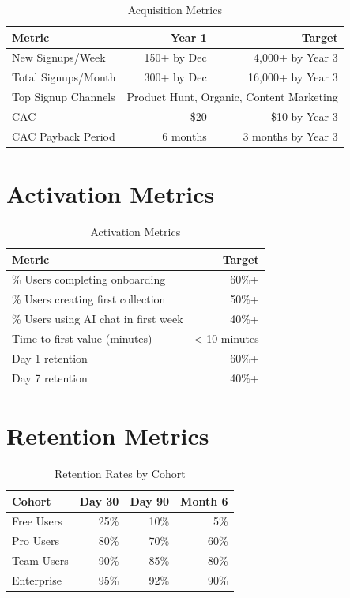 \documentclass{report}
\begin{document}
\begin{table}[h]
\centering
\begin{tabular}{|l|r|r|}
\toprule
\textbf{Metric} & \textbf{Year 1} & \textbf{Target} \\
\midrule
New Signups/Week & 150+ by Dec & 4,000+ by Year 3 \\
Total Signups/Month & 300+ by Dec & 16,000+ by Year 3 \\
Top Signup Channels & \multicolumn{2}{|l|}{Product Hunt, Organic, Content Marketing} \\
CAC & \$20 & \$10 by Year 3 \\
CAC Payback Period & 6 months & 3 months by Year 3 \\
\bottomrule
\end{tabular}
\caption{Acquisition Metrics}
\end{table}

\section{Activation Metrics}

\begin{table}[h]
\centering
\begin{tabular}{|l|r|}
\toprule
\textbf{Metric} & \textbf{Target} \\
\midrule
\% Users completing onboarding & 60\%+ \\
\% Users creating first collection & 50\%+ \\
\% Users using AI chat in first week & 40\%+ \\
Time to first value (minutes) & < 10 minutes \\
Day 1 retention & 60\%+ \\
Day 7 retention & 40\%+ \\
\bottomrule
\end{tabular}
\caption{Activation Metrics}
\end{table}

\section{Retention Metrics}

\begin{table}[h]
\centering
\begin{tabular}{|l|r|r|r|}
\toprule
\textbf{Cohort} & \textbf{Day 30} & \textbf{Day 90} & \textbf{Month 6} \\
\midrule
Free Users & 25\% & 10\% & 5\% \\
Pro Users & 80\% & 70\% & 60\% \\
Team Users & 90\% & 85\% & 80\% \\
Enterprise & 95\% & 92\% & 90\% \\
\bottomrule
\end{tabular}
\caption{Retention Rates by Cohort}
\end{table}
\end{document}
